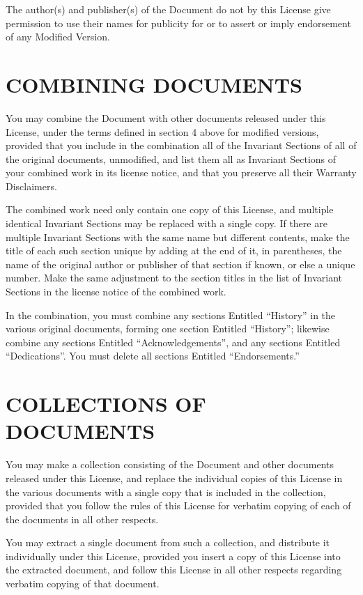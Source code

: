 The author(s) and publisher(s) of the Document do not by this
License give permission to use their names for publicity for
or to assert or imply endorsement of any Modified Version.

\section{COMBINING DOCUMENTS}

You may combine the Document with other documents released
under this License, under the terms defined in section 4
above for modified versions, provided that you include in
the combination all of the Invariant Sections of all of the
original documents, unmodified, and list them all as Invariant
Sections of your combined work in its license notice, and
that you preserve all their Warranty Disclaimers.

The combined work need only contain one copy of this License,
and multiple identical Invariant Sections may be replaced with
a single copy. If there are multiple Invariant Sections with
the same name but different contents, make the title of each
such section unique by adding at the end of it, in parentheses,
the name of the original author or publisher of that section
if known, or else a unique number. Make the same adjustment
to the section titles in the list of Invariant Sections in
the license notice of the combined work.

In the combination, you must combine any sections Entitled
“History” in the various original documents, forming
one section Entitled “History”; likewise combine any
sections Entitled “Acknowledgements”, and any sections
Entitled “Dedications”. You must delete all sections
Entitled “Endorsements.”

\section{COLLECTIONS OF DOCUMENTS}

You may make a collection consisting of the Document and
other documents released under this License, and replace the
individual copies of this License in the various documents
with a single copy that is included in the collection, provided
that you follow the rules of this License for verbatim copying
of each of the documents in all other respects.

You may extract a single document from such a collection, and
distribute it individually under this License, provided you
insert a copy of this License into the extracted document,
and follow this License in all other respects regarding
verbatim copying of that document.

